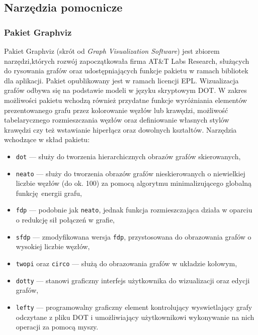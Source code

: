 \subsection{Narzędzia pomocnicze}\label{ss_internals_misc}
\subsubsection{\textbf{Pakiet Graphviz}}
\label{sss_internals_misc_graphviz}
\par{
  Pakiet Graphviz (skrót od \emph{Graph Visualization Software}) jest zbiorem narzędzi,których rozwój zapoczątkowała firma AT\&T Labs Research, służących do rysowania grafów oraz udostępniających funkcje pakietu w ramach bibliotek dla aplikacji.
  Pakiet opublikowany jest w ramach licencji EPL.
  Wizualizacja grafów odbywa się na podstawie modeli w języku skryptowym DOT.
  W zakres możliwości pakietu wchodzą również przydatne funkcje wyróżniania elementów prezentowanego grafu przez kolorowanie węzłów lub krawędzi, możliwość tabelarycznego rozmieszczania węzłów oraz definiowanie własnych stylów krawędzi czy też wstawianie hiperłącz oraz dowolnych kształtów.
  Narzędzia wchodzące w skład pakietu:
  \begin{itemize}
    \item \texttt{dot} --- służy do tworzenia hierarchicznych obrazów grafów skierowanych,
    \item \texttt{neato} --- służy do tworzenia obrazów grafów nieskierowanych o niewielkiej liczbie węzłów (do ok. 100) za pomocą algorytmu minimalizującego globalną funkcję energii grafu,
    \item \texttt{fdp} --- podobnie jak \texttt{neato}, jednak funkcja rozmieszczająca działa w oparciu o redukcję sił połączeń w grafie,
    \item \texttt{sfdp} --- zmodyfikowana wersja \texttt{fdp}, przystosowana do obrazowania grafów o wysokiej liczbie węzłów,
    \item \texttt{twopi} oraz \texttt{circo} --- służą do obrazowania grafów w układzie kołowym,
    \item \texttt{dotty} --- stanowi graficzny interfejs użytkownika do wizualizacji oraz edycji grafów,
    \item \texttt{lefty} --- programowalny graficzny element kontrolujący wyswietlający grafy odczytane z pliku DOT i umożliwiający użytkownikowi wykonywanie na nich operacji za pomocą myszy.
  \end{itemize}
}
